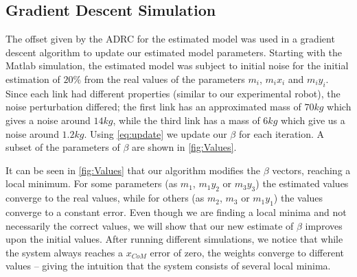 \documentclass[letterpaper, 10 pt, conference]{ieeeconf}
\begin{document}
\subsection{Gradient Descent Simulation}
\label{subsec:sim_results}

The offset given by the \ac{ADRC} for the estimated model was used in a gradient
descent algorithm to update our estimated model parameters. Starting with the
Matlab simulation, the estimated model was subject to initial noise for the
initial estimation of $20\%$ from the real values of the parameters $m_i$,
$m_ix_i$ and $m_iy_i$. Since each link had different properties (similar to our
experimental robot), the noise perturbation differed; the first link has an
approximated mass of $70 kg$  which gives a noise around $14kg$, while the third
link has a mass of $6kg$ which give us a noise around $1.2kg$. Using
\cref{eq:update} we update our $\beta$ for each iteration. A subset of
the parameters of $\beta$ are shown in \cref{fig:Values}.




It can be seen in \cref{fig:Values} that our algorithm modifies the $\beta$
vectors, reaching a local minimum. For some parameters (as $m_1$, $m_1y_2$ or
$m_3y_3$) the estimated values converge to the real values, while for others (as
$m_2$, $m_3$ or $m_1y_1$) the values converge to a constant error. Even though
we are finding a local minima and not necessarily the correct values, we will
show that our new estimate of $\beta$ improves upon the initial values. After
running different simulations, we notice that while the system always reaches a
$x_{CoM}$ error of zero, the weights converge to different values -- giving the
intuition that the system consists of several local minima.
\end{document}
